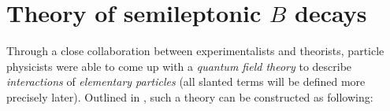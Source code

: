 


\chapter{Theory of semileptonic $B$ decays}
\label{ref:theory}

Through a close collaboration between experimentalists and theorists,
particle physicists were able to come up with a \emph{quantum field theory}
to describe \emph{interactions} of \emph{elementary particles}
(all slanted terms will be defined more precisely later).
Outlined in \cite{Robinson_2011},
such a theory can be constructed as following:

